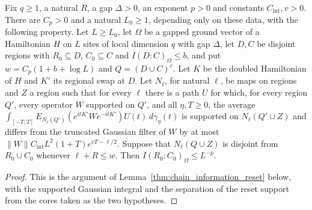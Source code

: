 \begin{lemma}
    \label{lem:information_reset_of_supported_localization}
    \leanok
    Fix $q\ge1$, a natural $R$, a gap $\Delta>0$, an exponent $p>0$ and
    constants $C_{\mathrm{int}},v>0$. There are $C_p>0$ and a natural
    $L_0\ge1$, depending only on these data, with the following property.
    Let $L\ge L_0$, let $\Omega$ be a gapped ground vector of a Hamiltonian
    $H$ on $L$ sites of local dimension $q$ with gap $\Delta$, let $D,C$ be
    disjoint regions with $R_0\subseteq D$, $C_0\subseteq C$ and
    $I(D:C)_\Omega\le b$, and put $w=C_p(1+b+\log L)$ and
    $Q=(D\cup C)^c$. Let $K$ be the doubled Hamiltonian of $H$ and $K'$
    its regional swap at $D$. Let $N_\ell$, for natural $\ell$, be maps on
    regions and $Z$ a region such that for every $\ell$ there is a path $U$
    for which, for every region $Q'$, every operator $W$ supported on $Q'$,
    and all $\eta,T\ge0$, the average
    $\int_{[-T,T]}E_{N_\ell(Q')}(e^{itK'}We^{-itK'})U(t)\,d\gamma_\eta(t)$
    is supported on $N_\ell(Q'\cup Z)$ and differs from the truncated
    Gaussian filter of $W$ by at most
    $\|W\|C_{\mathrm{int}}L^2(1+T)e^{vT-\ell/2}$. Suppose that
    $N_\ell(Q\cup Z)$ is disjoint from $R_0\cup C_0$ whenever
    $\ell+R\le w$. Then $I(R_0:C_0)_\Omega\le L^{-p}$.
\end{lemma}
\begin{proof}
    \leanok
    This is the argument of Lemma~\ref{thm:chain_information_reset} below,
    with the supported Gaussian integral and the separation of the reset
    support from the cores taken as the two hypotheses.
\end{proof}

